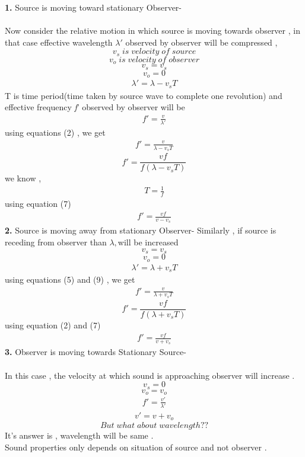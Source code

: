 \documentclass[journal,12pt,twocolumn]{IEEEtran}
\theoremstyle{remark}
\begin{document}
\textbf{1.} Source is moving toward stationary Observer-\\\\
Now consider the relative motion in which source is moving towards observer , in that case effective wavelength $\lambda'$ observed by observer will be compressed ,
$$v_s \;is\; velocity\; of\; source$$
$$v_o \;is\; velocity\; of\;observer $$
$$v_s = v_s$$
$$v_o = 0$$
\begin{align}\lambda' = \lambda - v_s T\end{align}
T is time period(time taken by source wave to complete one revolution)
and effective frequency \textit{f}' observed by observer will be
\begin{align}f' = \frac{v}{\lambda'}\end{align}
using equations (2) , we get
\begin{align}f' = \frac{v}{\lambda- v_s T}\end{align}
$$f' = \frac{v f}{f(\lambda- v_s T)}$$
we know ,
\begin{align}T = \frac{1}{f}\end{align}
using equation (7)
\begin{align}f' = \frac{v f}{v- v_s }\end{align}
\newpage
\bigskip
\textbf{2.} Source is moving away from stationary Observer-
Similarly , if source is receding from observer than $\lambda, $will be increased
$$v_s = v_s$$
$$v_o = 0$$
\begin{align}\lambda' = \lambda + v_s T\end{align}
using equations (5) and (9) , we get
\begin{align}f' = \frac{v}{\lambda+ v_s T}\end{align}
$$f' = \frac{v f}{f(\lambda+v_s T)}$$
using equation (2) and (7)
\begin{align}f' = \frac{v f}{v+ v_s }\end{align}
\textbf{3.} Observer is moving towards Stationary Source-\\\\
In this case , the velocity at which sound is approaching observer will increase .
$$v_s = 0$$
$$v_o = v_o$$
\begin{align}f' = \frac{v'}{\lambda'}\end{align}
\begin{align}v'= v+v_o\end{align}
$$But \;what\; about\; wavelength??$$
It's answer is , wavelength will be same  .\\
Sound properties only depends on situation of source and not observer .
\end{document}
